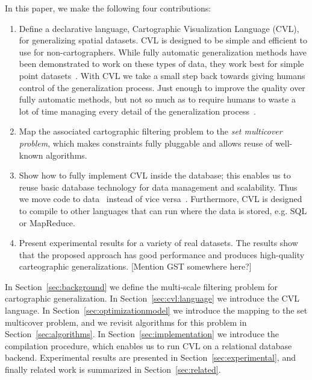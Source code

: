 In this paper, we make the following four contributions:
\begin{enumerate}
\item Define a declarative language, Cartographic Visualization Language (CVL), for generalizing spatial datasets. CVL is designed to be simple and efficient to use for non-cartographers. While fully automatic generalization methods have been demonstrated to work on these types of data, they work best for simple point datasets~\cite{thinningpaper}. With CVL we take a small step back towards giving humans control of the generalization process. Just enough to improve the quality over fully automatic methods, but not so much as to require humans to waste a lot of time managing every detail of the generalization process~\cite{fme}. 

\item Map the associated cartographic filtering problem to the \emph{set multicover problem}, which makes constraints fully pluggable and allows reuse of well-known algorithms.

\item Show how to fully implement CVL inside the database; this enables us to reuse basic database technology for data management and scalability. Thus we move code to data~\cite{mapreduce} instead of vice versa~\cite{fusiontables}. Furthermore, CVL is designed to compile to other languages that can run where the data is stored, e.g. SQL or MapReduce.

\item Present experimental results for a variety of real datasets. The results show that the proposed approach has good performance and produces high-quality carteographic generalizations. [Mention GST somewhere here?] 
\end{enumerate}

In Section~\ref{sec:background} we define the multi-scale filtering problem for cartographic generalization. In Section~\ref{sec:cvl:language} we introduce the CVL language. In Section~\ref{sec:optimizationmodel} we introduce the mapping to the set multicover problem, and we revisit algorithms for this problem in Section~\ref{sec:algorithms}. In Section~\ref{sec:implementation} we introduce the compilation procedure, which enables us to run CVL on a relational database backend. Experimental results are presented in Section~\ref{sec:experimental}, and finally related work is summarized in Section~\ref{sec:related}.

